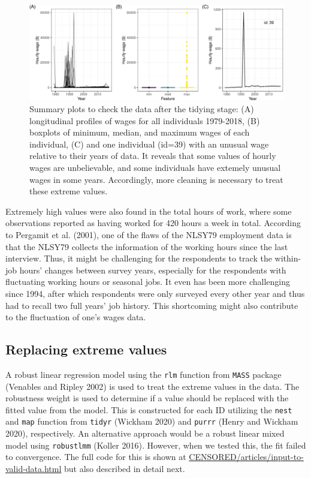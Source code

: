 \documentclass{article}
\begin{document}
\begin{figure}

{\centering \includegraphics[width=1\linewidth]{figures/feature-plot-1} 

}

\caption{Summary plots to check the data after the tidying stage: (A) longitudinal profiles of wages for all individuals 1979-2018, (B) boxplots of minimum, median, and maximum wages of each individual, (C) and one individual (id=39) with an unusual wage relative to their years of data. It reveals that some values of hourly wages are unbelievable, and some individuals have extemely unusual wages in some years. Accordingly, more cleaning is necessary to treat these extreme values.}\label{fig:feature-plot}
\end{figure}

Extremely high values were also found in the total hours of work, where some observations reported as having worked for 420 hours a week in total. According to Pergamit et al. (2001), one of the flaws of the NLSY79 employment data is that the NLSY79 collects the information of the working hours since the last interview. Thus, it might be challenging for the respondents to track the within-job hours' changes between survey years, especially for the respondents with fluctuating working hours or seasonal jobs. It even has been more challenging since 1994, after which respondents were only surveyed every other year and thus had to recall two full years' job history. This shortcoming might also contribute to the fluctuation of one's wages data.

\hypertarget{censor}{%
\subsection{Replacing extreme values}\label{censor}}

A robust linear regression model using the \texttt{rlm} function from \texttt{MASS} package (Venables and Ripley 2002) is used to treat the extreme values in the data. The robustness weight is used to determine if a value should be replaced with the fitted value from the model. This is constructed for each ID utilizing the \texttt{nest} and \texttt{map} function from \texttt{tidyr} (Wickham 2020) and \texttt{purrr} (Henry and Wickham 2020), respectively. An alternative approach would be a robust linear mixed model using \texttt{robustlmm} (Koller 2016). However, when we tested this, the fit failed to convergence. The full code for this is shown at \url{CENSORED/articles/input-to-valid-data.html} but also described in detail next.
\end{document}
